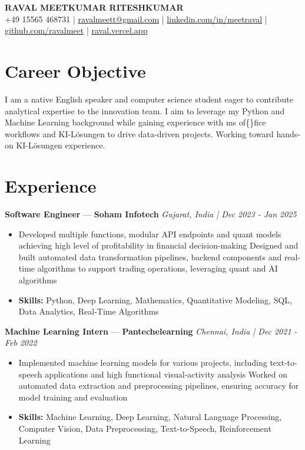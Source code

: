 \documentclass[a4paper,10pt]{article}
\begin{document}
\begin{center}
  {\Large\bfseries RAVAL MEETKUMAR RITESHKUMAR}\\[2pt]
  {\small +49 15565 468731 \;|\; \href{mailto:ravalmeett@gmail.com}{ravalmeett@gmail.com} \;|\; \href{https://www.linkedin.com/in/meetraval/}{linkedin.com/in/meetraval} \;|\; \href{https://github.com/ravalmeet}{github.com/ravalmeet} \;|\; \href{https://raval.vercel.app/}{raval.vercel.app}}
\end{center}
\vspace{-3pt}

\section*{Career Objective}
I am a native English speaker and computer science student eager to contribute analytical expertise to the innovation team. I aim to leverage my Python and Machine Learning background while gaining experience with ms of\{\}fice workflows and KI-Lösungen to drive data-driven projects. Working toward hands-on KI-Lösungen experience.\par

\section*{Experience}
\textbf{Software Engineer} — \textbf{Soham Infotech} \hfill \textit{Gujarat, India \;|\; Dec 2023 - Jan 2025}\par
\vspace{1pt}
\begin{itemize}
  \item Developed multiple functions, modular API endpoints and quant models achieving high level of profitability in financial decision-making Designed and built automated data transformation pipelines, backend components and real-time algorithms to support trading operations, leveraging quant and AI algorithms
  \item \textbf{Skills:} Python, Deep Learning, Mathematics, Quantitative Modeling, SQL, Data Analytics, Real-Time Algorithms
\end{itemize}
\vspace{3pt}
\textbf{Machine Learning Intern} — \textbf{Pantechelearning} \hfill \textit{Chennai, India \;|\; Dec 2021 - Feb 2022}\par
\vspace{1pt}
\begin{itemize}
  \item Implemented machine learning models for various projects, including text-to-speech applications and high functional visual-activity analysis Worked on automated data extraction and preprocessing pipelines, ensuring accuracy for model training and evaluation
  \item \textbf{Skills:} Machine Learning, Deep Learning, Natural Language Processing, Computer Vision, Data Preprocessing, Text-to-Speech, Reinforcement Learning
\end{itemize}
\end{document}
